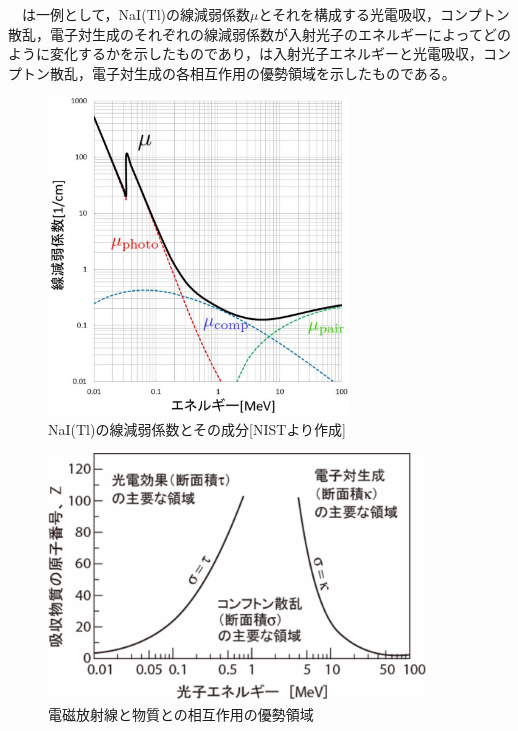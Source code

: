 \ \ は一例として，NaI(Tl)の線減弱係数$\mu$とそれを構成する光電吸収，コンプトン散乱，電子対生成のそれぞれの線減弱係数が入射光子のエネルギーによってどのように変化するかを示したものであり，は入射光子エネルギーと光電吸収，コンプトン散乱，電子対生成の各相互作用の優勢領域を示したものである。

\begin{figure}[H]
 \begin{center}
 \includegraphics[width=8cm]{image/other/NaI_mu.eps}
 \end{center}
 \caption{NaI(Tl)の線減弱係数とその成分[NIST\cite{nist}より作成]}
 \label{fig:mass_atten}
\end{figure}

\begin{figure}[H]
 \begin{center}
 \includegraphics[width=10cm]{image/other/mu_dist.eps}
 \end{center}
 \caption{電磁放射線と物質との相互作用の優勢領域\cite{QA}}
 \label{fig:mu_dist}
\end{figure}











